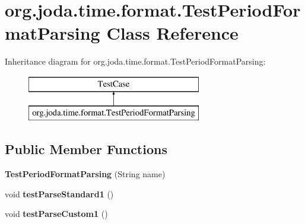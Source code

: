 \hypertarget{classorg_1_1joda_1_1time_1_1format_1_1_test_period_format_parsing}{\section{org.\-joda.\-time.\-format.\-Test\-Period\-Format\-Parsing Class Reference}
\label{classorg_1_1joda_1_1time_1_1format_1_1_test_period_format_parsing}
}
Inheritance diagram for org.\-joda.\-time.\-format.\-Test\-Period\-Format\-Parsing\-:\begin{figure}[H]
\begin{center}
\leavevmode
\includegraphics[height=2.000000cm]{classorg_1_1joda_1_1time_1_1format_1_1_test_period_format_parsing}
\end{center}
\end{figure}
\subsection*{Public Member Functions}
\begin{DoxyCompactItemize}
\item 
\hypertarget{classorg_1_1joda_1_1time_1_1format_1_1_test_period_format_parsing_a2d75c3292de10572dc3968a5372875f0}{{\bfseries Test\-Period\-Format\-Parsing} (String name)}\label{classorg_1_1joda_1_1time_1_1format_1_1_test_period_format_parsing_a2d75c3292de10572dc3968a5372875f0}

\item 
\hypertarget{classorg_1_1joda_1_1time_1_1format_1_1_test_period_format_parsing_ab0517bbaa4460524e53e98b759876c59}{void {\bfseries test\-Parse\-Standard1} ()}\label{classorg_1_1joda_1_1time_1_1format_1_1_test_period_format_parsing_ab0517bbaa4460524e53e98b759876c59}

\item 
\hypertarget{classorg_1_1joda_1_1time_1_1format_1_1_test_period_format_parsing_a5563b92aef8187293e09fd71dea0dd34}{void {\bfseries test\-Parse\-Custom1} ()}\label{classorg_1_1joda_1_1time_1_1format_1_1_test_period_format_parsing_a5563b92aef8187293e09fd71dea0dd34}

\end{DoxyCompactItemize}
